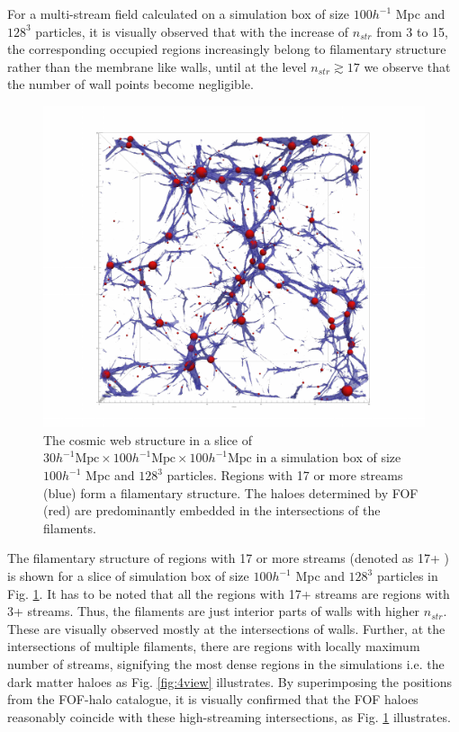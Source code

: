 
For a multi-stream field calculated on a simulation box of size $100 h^{-1}$ Mpc and $128^3$ particles, it is visually observed that with the increase of $n_{str}$ from 3 to 15,  the corresponding occupied regions increasingly belong to filamentary structure rather than the membrane like walls, until at the level $n_{str}  \gtrsim 17$ we observe that the number of wall points become negligible.

\begin{figure}
 \centering\includegraphics[width=18.5cm]{Chapter3/Source_v2/fig1.pdf} 
\caption{The cosmic web structure in a slice of  $30 h^{-1} \text{Mpc} \times 100 h^{-1} \text{Mpc} \times 100 h^{-1} \text{Mpc}$ in a simulation box of size $100 h^{-1}$ Mpc and $128^3$ particles. Regions with 17 or more streams (blue) form a filamentary structure. The haloes determined by FOF (red) are predominantly embedded in the intersections of the filaments.}
\label{fig:full}
\end{figure}

The filamentary structure of regions with 17 or more streams (denoted as 17+ ) is shown for a slice of simulation box of size $100 h^{-1}$  Mpc and $128^3$  particles in Fig. \ref{fig:full}. It has to be noted that all the regions with 17+ streams are regions with 3+ streams. Thus, the filaments are just interior
parts  of walls with higher $n_{str}$. These are visually observed mostly at the intersections of walls. Further, at the intersections of multiple filaments, there are regions with locally maximum number of streams, signifying the most dense regions in the simulations i.e. the dark matter haloes as Fig. \ref{fig:4view}
illustrates.
By superimposing the positions from the FOF-halo catalogue, it is visually confirmed that the FOF haloes reasonably coincide with these high-streaming intersections, as Fig. \ref{fig:full} illustrates.


